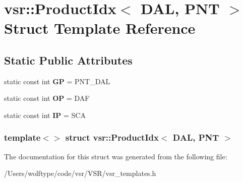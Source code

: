 \hypertarget{structvsr_1_1_product_idx_3_01_d_a_l_00_01_p_n_t_01_4}{\section{vsr\-:\-:Product\-Idx$<$ D\-A\-L, P\-N\-T $>$ Struct Template Reference}
\label{structvsr_1_1_product_idx_3_01_d_a_l_00_01_p_n_t_01_4}
}
\subsection*{Static Public Attributes}
\begin{DoxyCompactItemize}
\item 
\hypertarget{structvsr_1_1_product_idx_3_01_d_a_l_00_01_p_n_t_01_4_acb3e3c95bac7d677aa60b40c9805dac4}{static const int {\bfseries G\-P} = P\-N\-T\-\_\-\-D\-A\-L}\label{structvsr_1_1_product_idx_3_01_d_a_l_00_01_p_n_t_01_4_acb3e3c95bac7d677aa60b40c9805dac4}

\item 
\hypertarget{structvsr_1_1_product_idx_3_01_d_a_l_00_01_p_n_t_01_4_aca2d2a6dbe81e9a147cb66ffff109f2d}{static const int {\bfseries O\-P} = D\-A\-F}\label{structvsr_1_1_product_idx_3_01_d_a_l_00_01_p_n_t_01_4_aca2d2a6dbe81e9a147cb66ffff109f2d}

\item 
\hypertarget{structvsr_1_1_product_idx_3_01_d_a_l_00_01_p_n_t_01_4_ae8fe03b14faae290e16999a07614ed97}{static const int {\bfseries I\-P} = S\-C\-A}\label{structvsr_1_1_product_idx_3_01_d_a_l_00_01_p_n_t_01_4_ae8fe03b14faae290e16999a07614ed97}

\end{DoxyCompactItemize}
\subsubsection*{template$<$$>$ struct vsr\-::\-Product\-Idx$<$ D\-A\-L, P\-N\-T $>$}



The documentation for this struct was generated from the following file\-:\begin{DoxyCompactItemize}
\item 
/\-Users/wolftype/code/vsr/\-V\-S\-R/vsr\-\_\-templates.\-h\end{DoxyCompactItemize}
